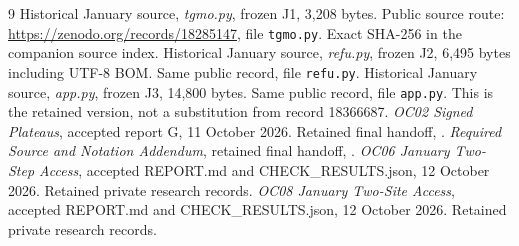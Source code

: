 \documentclass[11pt,a4paper]{article}
\theoremstyle{definition}
\theoremstyle{remark}\newtheorem{remark}[theorem]{Remark}
\numberwithin{equation}{section}
\begin{document}
\begin{thebibliography}{9}
 Historical January source, \emph{tgmo.py}, frozen J1, 3,208 bytes.
Public source route: \url{https://zenodo.org/records/18285147}, file
\texttt{tgmo.py}. Exact SHA-256 in the companion source index.
 Historical January source, \emph{refu.py}, frozen J2, 6,495 bytes
including UTF-8 BOM. Same public record, file \texttt{refu.py}.
 Historical January source, \emph{app.py}, frozen J3, 14,800 bytes.
Same public record, file \texttt{app.py}. This is the retained version, not a
substitution from record 18366687.
 \emph{OC02 Signed Plateaus}, accepted report G, 11 October 2026.
Retained final handoff, .
 \emph{Required Source and Notation Addendum}, retained final handoff,
.
 \emph{OC06 January Two-Step Access}, accepted REPORT.md and
CHECK\_RESULTS.json, 12 October 2026. Retained private research records.
 \emph{OC08 January Two-Site Access}, accepted REPORT.md and
CHECK\_RESULTS.json, 12 October 2026. Retained private research records.
\end{thebibliography}
\end{document}
